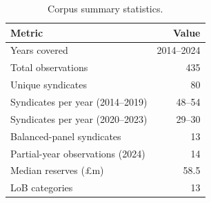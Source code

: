 \begin{table}[htbp]
\centering
\caption{Corpus summary statistics.}
\label{tab:corpus_summary}
\begin{tabular}{lr}
\toprule
Metric & Value \\
\midrule
Years covered & 2014--2024 \\
Total observations & 435 \\
Unique syndicates & 80 \\
Syndicates per year (2014--2019) & 48--54 \\
Syndicates per year (2020--2023) & 29--30 \\
Balanced-panel syndicates & 13 \\
Partial-year observations (2024) & 14 \\
Median reserves (\pounds m) & 58.5 \\
LoB categories & 13 \\
\bottomrule
\end{tabular}
\end{table}